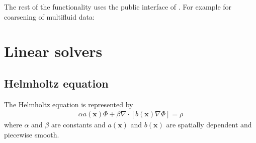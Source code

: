 \documentclass[letterpaper,10pt,english]{sphinxmanual}
\begin{document}
\begin{sphinxVerbatim}[commandchars=\\\{\},formatcom=\scriptsize]
 
 

\end{sphinxVerbatim}

The rest of the functionality uses the public interface of {\hyperref[\detokenize{Source/AmrMesh:chap-amrmesh}]{}}.
For example for coarsening of multifluid data:

\begin{sphinxVerbatim}[commandchars=\\\{\},formatcom=\scriptsize]
 
 
 

 
\end{sphinxVerbatim}


\section{Linear solvers}
\label{\detokenize{Source/LinearSolvers:linear-solvers}}\label{\detokenize{Source/LinearSolvers:chap-linearsolvers}}\label{\detokenize{Source/LinearSolvers::doc}}

\subsection{Helmholtz equation}
\label{\detokenize{Source/LinearSolvers:helmholtz-equation}}\label{\detokenize{Source/LinearSolvers:chap-helmholtz}}
The Helmholtz equation is represented by
\begin{equation*}
\begin{split}\alpha a\left(\mathbf{x}\right)\Phi + \beta\nabla\cdot\left[b\left(\mathbf{x}\right)\nabla\Phi\right] = \rho\end{split}
\end{equation*}
where \(\alpha\) and \(\beta\) are constants and \(a\left(\mathbf{x}\right)\) and \(b\left(\mathbf{x}\right)\) are spatially dependent and piecewise smooth.
\end{document}
